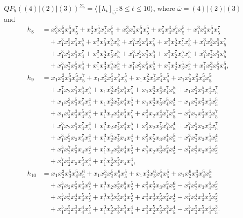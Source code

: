 \documentclass[reqno]{amsart}
\theoremstyle{plain}
\theoremstyle{definition}
\theoremstyle{plain}
\theoremstyle{definition}
\numberwithin{equation}{section}
\begin{document}
$QP_5((4)|(2)|(3))^{\Sigma_5} = \langle [h_t]_{\overline{\omega}} : 8 \leqslant t \leqslant 10 \rangle$, where $\overline{\omega} = (4)|(2)|(3)$ and
\begin{align*}
h_8 &= x_2^{3}x_3^{5}x_4^{5}x_5^{7} + x_2^{3}x_3^{5}x_4^{7}x_5^{5} + x_2^{3}x_3^{7}x_4^{5}x_5^{5} + x_2^{7}x_3^{3}x_4^{5}x_5^{5} + x_1^{3}x_3^{5}x_4^{5}x_5^{7}\\ &\quad + x_1^{3}x_3^{5}x_4^{7}x_5^{5} + x_1^{3}x_3^{7}x_4^{5}x_5^{5} + x_1^{3}x_2^{5}x_4^{5}x_5^{7} + x_1^{3}x_2^{5}x_4^{7}x_5^{5} + x_1^{3}x_2^{5}x_3^{5}x_5^{7}\\ &\quad + x_1^{3}x_2^{5}x_3^{5}x_4^{7} + x_1^{3}x_2^{5}x_3^{7}x_5^{5} + x_1^{3}x_2^{5}x_3^{7}x_4^{5} + x_1^{3}x_2^{7}x_4^{5}x_5^{5} + x_1^{3}x_2^{7}x_3^{5}x_5^{5}\\ &\quad + x_1^{3}x_2^{7}x_3^{5}x_4^{5} + x_1^{7}x_3^{3}x_4^{5}x_5^{5} + x_1^{7}x_2^{3}x_4^{5}x_5^{5} + x_1^{7}x_2^{3}x_3^{5}x_5^{5} + x_1^{7}x_2^{3}x_3^{5}x_4^{5},\\
h_9 &= x_1x_2^{2}x_3^{5}x_4^{5}x_5^{7} + x_1x_2^{2}x_3^{5}x_4^{7}x_5^{5} + x_1x_2^{2}x_3^{7}x_4^{5}x_5^{5} + x_1x_2^{7}x_3^{2}x_4^{5}x_5^{5}\\ &\quad + x_1^{7}x_2x_3^{2}x_4^{5}x_5^{5} + x_1x_2^{3}x_3^{4}x_4^{5}x_5^{7} + x_1x_2^{3}x_3^{4}x_4^{7}x_5^{5} + x_1x_2^{3}x_3^{5}x_4^{4}x_5^{7}\\ &\quad + x_1x_2^{3}x_3^{5}x_4^{7}x_5^{4} + x_1x_2^{3}x_3^{7}x_4^{4}x_5^{5} + x_1x_2^{3}x_3^{7}x_4^{5}x_5^{4} + x_1x_2^{7}x_3^{3}x_4^{4}x_5^{5}\\ &\quad + x_1x_2^{7}x_3^{3}x_4^{5}x_5^{4} + x_1^{3}x_2x_3^{4}x_4^{5}x_5^{7} + x_1^{3}x_2x_3^{4}x_4^{7}x_5^{5} + x_1^{3}x_2x_3^{5}x_4^{4}x_5^{7}\\ &\quad + x_1^{3}x_2x_3^{5}x_4^{7}x_5^{4} + x_1^{3}x_2x_3^{7}x_4^{4}x_5^{5} + x_1^{3}x_2x_3^{7}x_4^{5}x_5^{4} + x_1^{3}x_2^{5}x_3x_4^{4}x_5^{7}\\ &\quad + x_1^{3}x_2^{5}x_3x_4^{7}x_5^{4} + x_1^{3}x_2^{5}x_3^{7}x_4x_5^{4} + x_1^{3}x_2^{7}x_3x_4^{4}x_5^{5} + x_1^{3}x_2^{7}x_3x_4^{5}x_5^{4}\\ &\quad + x_1^{3}x_2^{7}x_3^{5}x_4x_5^{4} + x_1^{7}x_2x_3^{3}x_4^{4}x_5^{5} + x_1^{7}x_2x_3^{3}x_4^{5}x_5^{4} + x_1^{7}x_2^{3}x_3x_4^{4}x_5^{5}\\ &\quad + x_1^{7}x_2^{3}x_3x_4^{5}x_5^{4} + x_1^{7}x_2^{3}x_3^{5}x_4x_5^{4},\\
h_{10} &= x_1x_2^{3}x_3^{5}x_4^{5}x_5^{6} + x_1x_2^{3}x_3^{5}x_4^{6}x_5^{5} + x_1x_2^{3}x_3^{6}x_4^{5}x_5^{5} + x_1x_2^{6}x_3^{3}x_4^{5}x_5^{5}\\ &\quad + x_1^{3}x_2x_3^{5}x_4^{5}x_5^{6} + x_1^{3}x_2x_3^{5}x_4^{6}x_5^{5} + x_1^{3}x_2^{5}x_3x_4^{5}x_5^{6} + x_1^{3}x_2^{5}x_3x_4^{6}x_5^{5}\\ &\quad + x_1^{3}x_2^{3}x_3^{4}x_4^{5}x_5^{5} + x_1^{3}x_2^{3}x_3^{5}x_4^{4}x_5^{5} + x_1^{3}x_2^{3}x_3^{5}x_4^{5}x_5^{4} + x_1^{3}x_2^{4}x_3^{3}x_4^{5}x_5^{5}\\ &\quad + x_1^{3}x_2^{5}x_3^{3}x_4^{4}x_5^{5} + x_1^{3}x_2^{5}x_3^{3}x_4^{5}x_5^{4} + x_1^{3}x_2^{5}x_3^{5}x_4^{3}x_5^{4} + x_1^{3}x_2^{5}x_3^{5}x_4^{4}x_5^{3}.
\end{align*}
\end{document}
